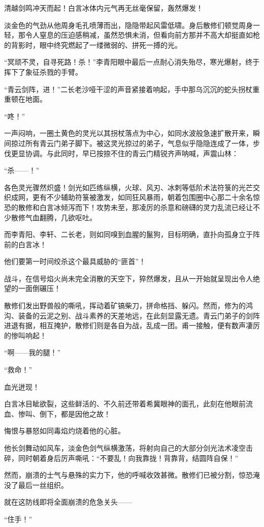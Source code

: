 清越剑鸣冲天而起！白言冰体内元气再无丝毫保留，轰然爆发！

淡金色的气劲从他周身毛孔喷薄而出，隐隐带起风雷低啸。身后散修们顿觉周身一轻，那令人窒息的压迫感稍减，虽然恐惧未消，但看向前方那并不高大却挺直如枪的背影时，眼中终究燃起了一缕微弱的、拼死一搏的光。

“冥顽不灵，自寻死路！杀！”李青阳眼中最后一点耐心消失殆尽，寒光爆射，终于挥下了象征杀戮的手臂。

“青云剑阵，进！”二长老沙哑干涩的声音紧接着响起，手中那乌沉沉的蛇头拐杖重重顿在地面。

“咚！”

一声闷响，一圈土黄色的灵光以其拐杖落点为中心，如同水波般急速扩散开来，瞬间掠过所有青云门弟子脚下。被这灵光掠过的弟子，气息似乎隐隐连成了一体，步伐更显协调。与此同时，早已按捺不住的青云门精锐齐声呐喊，声震山林：

“杀——！”

各色灵光骤然炽盛！剑光如匹练纵横，火球、风刃、冰刺等低阶术法符箓的光芒交织成网，更有不少辅助符箓被激发，如同狂风暴雨，朝着包围圈中心那二十余名惊恐的散修和白言冰倾泻而下！攻势未至，那凌厉的杀意和磅礴的灵力乱流已经让不少散修气血翻腾，几欲呕吐。

而李青阳、李轩、二长老，则如同嗅到血腥的鬣狗，目标明确，直扑向孤身立于阵前的白言冰！

他们要第一时间绞杀这个最具威胁的“匪首”！

战斗，在信号焰火尚未完全消散的天空下，猝然爆发，且从一开始就呈现出令人绝望的一面倒碾压！

散修们发出野兽般的嘶吼，挥动着矿镐柴刀，拼命格挡、躲闪。然而，修为的鸿沟、装备的云泥之别、战斗素养的天差地远，在此刻显露无遗。青云门弟子的剑阵进退有据，相互掩护，散修们则是各自为战，乱成一团。甫一接触，便有数声凄厉的惨叫响起！

“啊——我的腿！”

“救命！”

血光迸现！

白言冰目眦欲裂，这些鲜活的、不久前还带着希冀眼神的面孔，此刻在他眼前流血、惨叫、倒下，都是因他之故！

悔恨与暴怒如同毒焰灼烧着他的心脏。

他长剑舞动如风车，淡金色剑气纵横激荡，将射向自己的大部分剑光法术凌空击碎，同时朝着身后厉声嘶吼：“不要乱！向我靠拢！背靠背，结圆阵自保！”

然而，崩溃的士气与悬殊的实力下，他的呼喊收效甚微。散修们已被分割，惊恐淹没了最后一丝组织。

就在这防线即将全面崩溃的危急关头——

“住手！”

